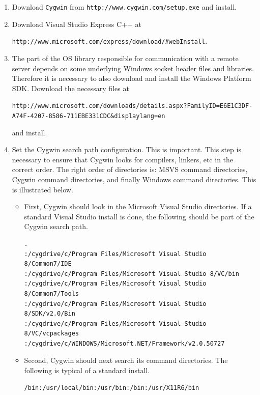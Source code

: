 \documentclass[11pt]{article}
\renewcommand{\_}{{\char"5F}}
\renewcommand{\{}{{\char"7B}}
\renewcommand{\}}{{\char"7D}}
\renewcommand{\^}{{\char"0D}}
\renewcommand{\'}{{\char"0D}}
\newcommand{\UrlCl}{http://www.microsoft.com/express/download/\#webInstall}
\newcommand{\UrlCygwinSetup}{http://www.cygwin.com/setup.exe}
\newcommand{\UrlSdk}{http://www.microsoft.com/downloads/details.aspx?FamilyID=E6E1C3DF-A74F-4207-8586-711EBE331CDC\&displaylang=en}
\begin{document}
\begin{enumerate}[Step 1:]
\item{}  Download {\tt Cygwin}  from {\tt\UrlCygwinSetup} and install.




\item{}  Download  Visual Studio Express C++ at  

{\tt\UrlCl}.


\item{}  The part of the OS library responsible for communication with a remote server depends on some
underlying Windows socket header files and libraries. Therefore it is necessary to also download and install
the Windows Platform SDK. Download the necessary files at

{\scriptsize\tt\UrlSdk}

 and install.



\item{}  Set the Cygwin search path configuration. This is important.
This step is necessary to ensure that Cygwin   looks for compilers, linkers, etc in the correct order.  The right order of directories  is: MSVS command directories, Cygwin command directories, and finally Windows command directories.  This is illustrated below.

\begin{itemize}

 \item First, Cygwin should look in the Microsoft Visual Studio directories.
If a standard Visual Studio install is done, the following  should be part of the
Cygwin search path.

\begin{verbatim}
.
:/cygdrive/c/Program Files/Microsoft Visual Studio 8/Common7/IDE
:/cygdrive/c/Program Files/Microsoft Visual Studio 8/VC/bin
:/cygdrive/c/Program Files/Microsoft Visual Studio 8/Common7/Tools
:/cygdrive/c/Program Files/Microsoft Visual Studio 8/SDK/v2.0/Bin
:/cygdrive/c/Program Files/Microsoft Visual Studio 8/VC/vcpackages
:/cygdrive/c/WINDOWS/Microsoft.NET/Framework/v2.0.50727
\end{verbatim}

\item Second, Cygwin should next search its  command directories.  The following is typical of a standard install.

\begin{verbatim}
/bin:/usr/local/bin:/usr/bin:/bin:/usr/X11R6/bin
\end{verbatim}


\end{itemize}
\end{enumerate}
\end{document}
